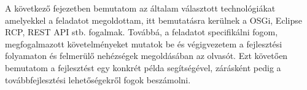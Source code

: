 A következő fejezetben bemutatom az általam választott technológiákat amelyekkel a feladatot megoldottam, itt bemutatásra kerülnek a OSGi, Eclipse RCP, REST API stb. fogalmak. Továbbá, a feladatot specifikálni fogom, megfogalmazott követelményeket mutatok be és végigvezetem a fejlesztési folyamaton és felmerülő nehézségek megoldásában az olvasót. Ezt követően bemutatom a fejlesztést egy konkrét példa segítségével, zárásként pedig a továbbfejlesztési lehetőségekről fogok beszámolni.





















